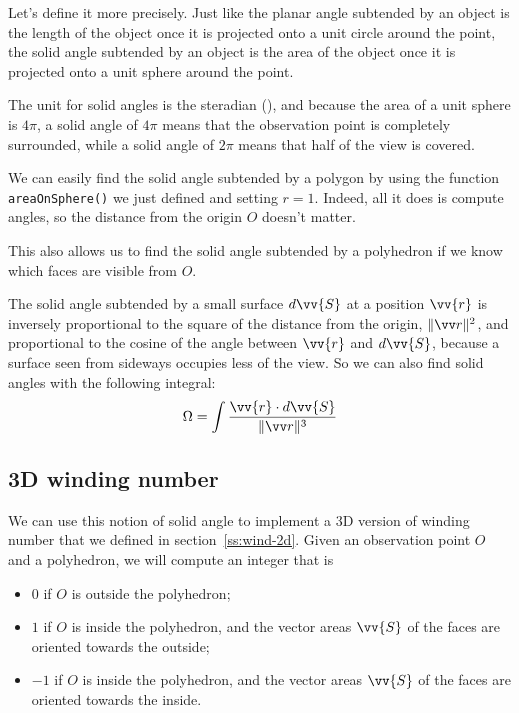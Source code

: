Let's define it more precisely. Just like the planar angle subtended by an object is the length of the object once it is projected onto a unit circle around the point, the solid angle subtended by an object is the area of the object once it is projected onto a unit sphere around the point.


The unit for solid angles is the steradian (\steradian), and because the area of a unit sphere is $4\pi$, a solid angle of $4\pi$ means that the observation point is completely surrounded, while a solid angle of $2\pi$ means that half of the view is covered.

We can easily find the solid angle subtended by a polygon by using the function \lstinline|areaOnSphere()| we just defined and setting $r=1$. Indeed, all it does is compute angles, so the distance from the origin $O$ doesn't matter.



This also allows us to find the solid angle subtended by a polyhedron if we know which faces are visible from $O$.

\begin{mathy}
The solid angle subtended by a small surface $d\vv{S}$ at a position $\vv{r}$ is inversely proportional to the square of the distance from the origin, $\normv{r}^2$, and proportional to the cosine of the angle between $\vv{r}$ and $d\vv{S}$, because a surface seen from sideways occupies less of the view. So we can also find solid angles with the following integral:
\[\Omega = \int \frac{\vv{r}\cdot d\vv{S}}{\normv{r}^3}\]
\end{mathy}

\subsection{3D winding number}\label{ss:wind-3d}
We can use this notion of solid angle to implement a 3D version of winding number that we defined in section~\ref{ss:wind-2d}. Given an observation point $O$ and a polyhedron, we will compute an integer that is
\begin{itemize}
\item $0$ if $O$ is outside the polyhedron;
\item $1$ if $O$ is inside the polyhedron, and the vector areas $\vv{S}$ of the faces are oriented towards the outside;
\item $-1$ if $O$ is inside the polyhedron, and the vector areas $\vv{S}$ of the faces are oriented towards the inside.
\end{itemize}

